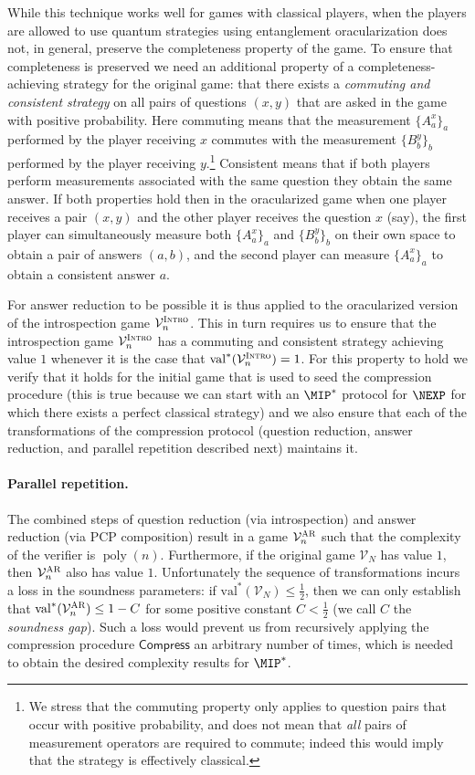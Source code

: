 \documentclass[11pt]{article}
\theoremstyle{definition}
\DeclareMathOperator{\poly}{poly}
\newcommand{\val}{\ensuremath{\mathrm{val}}}
\newcommand{\verifier}{\mathcal{V}}
\newcommand{\gamestyle}[1]{\ensuremath{\textsc{#1}}\xspace}
\newcommand{\ar}{\gamestyle{AR}}
\newcommand{\intro}{\gamestyle{Intro}}
\newcommand{\tmstyle}[1]{\ensuremath{\mathsf{#1}}}
\newcommand{\Compress}{\tmstyle{Compress}}
\begin{document}
While this technique works well for games with classical players, when the players are allowed to use quantum strategies using entanglement oracularization does not, in general, preserve the completeness property of the game. To ensure that completeness is preserved we need an additional property of a completeness-achieving strategy for the original game: that there exists a \emph{commuting and consistent strategy} on all pairs of questions $(x,y)$ that are asked in the game with positive probability. Here commuting means that the measurement $\{A^x_a\}_a$ performed by the player receiving $x$ commutes with the measurement $\{B^y_b\}_b$ performed by the player receiving $y$.\footnote{We stress that the commuting property only applies to question pairs that occur with positive probability, and does not mean that \emph{all} pairs of measurement operators are required to commute; indeed this would imply that the strategy is effectively classical.} Consistent means that if both players perform measurements associated with the same question they obtain the same answer. If both properties hold then in the oracularized game when one player receives a pair $(x,y)$ and the other player receives the question $x$ (say), the first player can simultaneously measure both $\{A^x_a\}_a$ and $\{B^y_b\}_b$ on their own space to obtain a pair of answers $(a,b)$, and the second player can measure $\{A^x_a\}_a$ to obtain a consistent answer $a$.

For answer reduction to be possible it is thus applied to the {oracularized} version of the introspection game $\verifier^\intro_n$. This in turn requires us to ensure that the introspection game $\verifier^\intro_n$ has a commuting and consistent strategy achieving value $1$ whenever it is the case that $\val^*(\verifier_n^\intro)=1$. For this property to hold we verify that it holds for the initial game that is used to seed the compression procedure (this is true because we can start with an $\MIP^*$ protocol for $\NEXP$ for which there exists a perfect classical strategy) and we also ensure that each of the transformations of the compression protocol (question reduction, answer reduction, and parallel repetition described next) maintains it.


\paragraph{Parallel repetition.}
The combined steps of question reduction (via introspection) and answer reduction (via PCP composition) result in a game $\verifier_n^\ar$ such that the complexity of the verifier is $\poly(n)$. Furthermore, if the original game $\verifier_N$ has value $1$, then $\verifier_n^\ar$ also has value $1$. Unfortunately the sequence of transformations incurs a loss in the soundness parameters: if $\val^*(\verifier_N) \leq \frac{1}{2}$, then we can only establish that $\val^*(\verifier^\ar_n) \leq 1 - C$ for some positive constant $C < \frac{1}{2}$ (we call $C$ the \emph{soundness gap}). Such a loss would prevent us from recursively applying the compression procedure $\Compress$ an arbitrary number of times, which is needed to obtain the desired complexity results for $\MIP^*$. 
\end{document}
